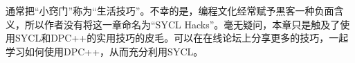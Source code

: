 

通常把“小窍门”称为“生活技巧”。不幸的是，编程文化经常赋予黑客一种负面含义，所以作者没有将这一章命名为“SYCL Hacks”。毫无疑问，本章只是触及了使用SYCL和DPC++的实用技巧的皮毛。可以在在线论坛上分享更多的技巧，一起学习如何使用DPC++，从而充分利用SYCL。\par


\newpage